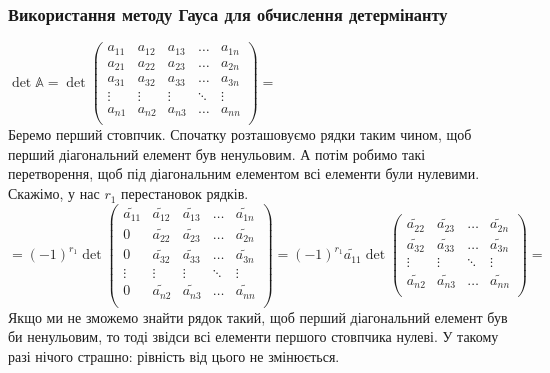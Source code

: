 \documentclass[a4paper, 10pt]{article}
\theoremstyle{theoremdd}
\begin{document}
\subsubsection*{Використання методу Гауса для обчислення детермінанту}
$\det \mathbb{A} = \det \begin{pmatrix} 
a_{11} & a_{12} & a_{13} & \dots & a_{1n} \\
a_{21} & a_{22} & a_{23} & \dots & a_{2n} \\
a_{31} & a_{32} & a_{33} & \dots & a_{3n} \\
\vdots & \vdots & \vdots & \ddots & \vdots \\
a_{n1} & a_{n2} & a_{n3} & \dots & a_{nn} \\
\end{pmatrix} = $\\
Беремо перший стовпчик. Спочатку розташовуємо рядки таким чином, щоб перший діагональний елемент був ненульовим. А потім робимо такі перетворення, щоб під діагональним елементом всі елементи були нулевими. Скажімо, у нас $r_1$ перестановок рядків.\\
$= (-1)^{r_1} \det \begin{pmatrix}
\tilde{a_{11}} & \tilde{a_{12}} & \tilde{a_{13}} & \dots & \tilde{a_{1n}} \\
0 & \tilde{a_{22}} & \tilde{a_{23}} & \dots & \tilde{a_{2n}} \\
0 & \tilde{a_{32}} & \tilde{a_{33}} & \dots & \tilde{a_{3n}} \\
\vdots & \vdots & \vdots & \ddots & \vdots \\
0 & \tilde{a_{n2}} & \tilde{a_{n3}} & \dots & \tilde{a_{nn}} \\
\end{pmatrix} = (-1)^{r_1} \tilde{a_{11}} \det \begin{pmatrix}
\tilde{a_{22}} & \tilde{a_{23}} & \dots & \tilde{a_{2n}} \\
\tilde{a_{32}} & \tilde{a_{33}} & \dots & \tilde{a_{3n}} \\
\vdots & \vdots & \ddots & \vdots \\
\tilde{a_{n2}} & \tilde{a_{n3}} & \dots & \tilde{a_{nn}} \\
\end{pmatrix} \boxed{=}$\\
Якщо ми не зможемо знайти рядок такий, щоб перший діагональний елемент був би ненульовим, то тоді звідси всі елементи першого стовпчика нулеві. У такому разі нічого страшно: рівність від цього не змінюється.
\bigskip \\
\end{document}
